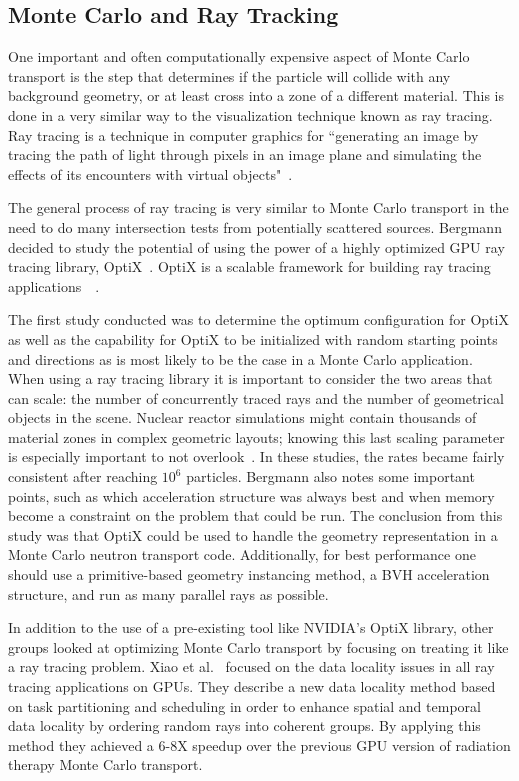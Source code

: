 \subsection{\textbf{Monte Carlo and Ray Tracking}}

One important and often computationally expensive aspect of Monte Carlo transport is the step that determines if the particle will collide with any background geometry, or at least cross into a zone of a different material.
%
This is done in a very similar way to the visualization technique known as ray tracing.
%
Ray tracing is a technique in computer graphics for ``generating an image by tracing the path of light through pixels in an image plane and simulating the effects of its encounters with virtual objects"~\cite{wikipediaRayTracing}.

The general process of ray tracing is very similar to Monte Carlo transport in the need to do many intersection tests from potentially scattered sources.
%
Bergmann decided to study the potential of using the power of a highly optimized GPU ray tracing library, OptiX~\cite{2014development}.
%
OptiX is a scalable framework for building ray tracing applications~\cite{optixProgrammingGuide}~\cite{parker2010optix}.

%
The first study conducted was to determine the optimum configuration for OptiX as well as the capability for OptiX to be initialized with random starting points and directions as is most likely to be the case in a Monte Carlo application.
%
When using a ray tracing library it is important to consider the two areas that can scale: the number of concurrently traced rays and the number of geometrical objects in the scene.
%
Nuclear reactor simulations might contain thousands of material zones in complex geometric layouts; knowing this last scaling parameter is especially important to not overlook~\cite{2014development}.
%
In these studies, the rates became fairly consistent after reaching $10^6$ particles.
Bergmann also notes some important points, such as which acceleration structure was always best and when memory become a constraint on the problem that could be run.
 The conclusion from this study was that OptiX could be used to handle the geometry representation in a Monte Carlo neutron transport code.
 Additionally, for best performance one should use a primitive-based geometry instancing method, a BVH acceleration structure, and run as many parallel rays as possible.
%

%
In addition to the use of a pre-existing tool like NVIDIA's OptiX library, other groups looked at optimizing Monte Carlo transport by focusing on treating it like a ray tracing problem.
%
Xiao et al.~\cite{xiao2015monte} focused on the data locality issues in all ray tracing applications on GPUs.
%
They describe a new data locality method based on task partitioning and scheduling in order to enhance spatial and temporal data locality by ordering random rays into coherent groups.
%
By applying this method they achieved a 6-8X speedup over the previous GPU version of radiation therapy Monte Carlo transport. 
%


